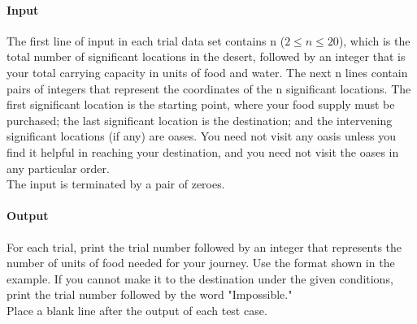 \documentclass{book}
\begin{document}
\begin{enumerate}
\begin{enumerate}
		\paragraph{Input}
		The first line of input in each trial data set contains n ($2 \le n \le 20$), which is the total number of significant locations in the desert, followed by an integer that is your total carrying capacity in units of food and water. The next n lines contain pairs of integers that represent the coordinates of the n significant locations. The first significant location is the starting point, where your food supply must be purchased; the last significant location is the destination; and the intervening significant locations (if any) are oases. You need not visit any oasis unless you find it helpful in reaching your destination, and you need not visit the oases in any particular order. \\
		The input is terminated by a pair of zeroes.
		\paragraph{Output}
		For each trial, print the trial number followed by an integer that represents the number of units of food needed for your journey. Use the format shown in the example. If you cannot make it to the destination under the given conditions, print the trial number followed by the word "Impossible."\\
		Place a blank line after the output of each test case.

\end{enumerate}
\end{enumerate}
\end{document}
